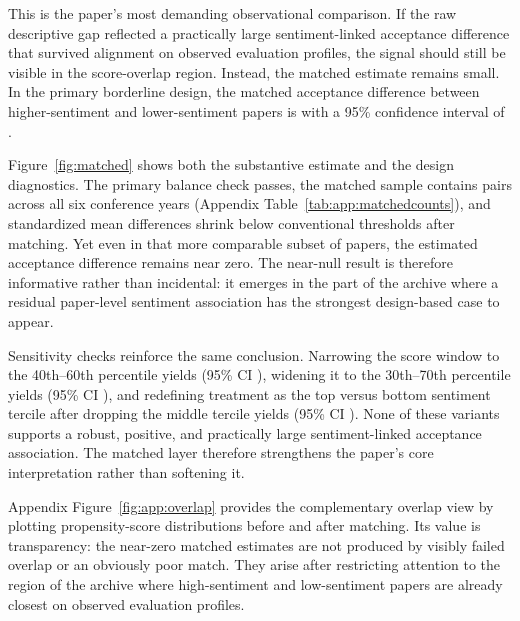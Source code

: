 \documentclass[9pt,twocolumn]{pnas-new}
\begin{document}
This is the paper's most demanding observational comparison. If the raw descriptive gap reflected a practically large sentiment-linked acceptance difference that survived alignment on observed evaluation profiles, the signal should still be visible in the score-overlap region. Instead, the matched estimate remains small. In the primary borderline design, the matched acceptance difference between higher-sentiment and lower-sentiment papers is \PSMATT{} with a 95\% confidence interval of \PSMATTCI{}.

Figure~\ref{fig:matched} shows both the substantive estimate and the design diagnostics. The primary balance check passes, the matched sample contains \MatchedPairs{} pairs across all six conference years (Appendix Table~\ref{tab:app:matchedcounts}), and standardized mean differences shrink below conventional thresholds after matching. Yet even in that more comparable subset of papers, the estimated acceptance difference remains near zero. The near-null result is therefore informative rather than incidental: it emerges in the part of the archive where a residual paper-level sentiment association has the strongest design-based case to appear.

Sensitivity checks reinforce the same conclusion. Narrowing the score window to the 40th--60th percentile yields \PSMNarrowATT{} (95\% CI \PSMNarrowATTCI{}), widening it to the 30th--70th percentile yields \PSMWideATT{} (95\% CI \PSMWideATTCI{}), and redefining treatment as the top versus bottom sentiment tercile after dropping the middle tercile yields \PSMRobustATT{} (95\% CI \PSMRobustATTCI{}). None of these variants supports a robust, positive, and practically large sentiment-linked acceptance association. The matched layer therefore strengthens the paper's core interpretation rather than softening it.

Appendix Figure~\ref{fig:app:overlap} provides the complementary overlap view by plotting propensity-score distributions before and after matching. Its value is transparency: the near-zero matched estimates are not produced by visibly failed overlap or an obviously poor match. They arise after restricting attention to the region of the archive where high-sentiment and low-sentiment papers are already closest on observed evaluation profiles.
\end{document}

